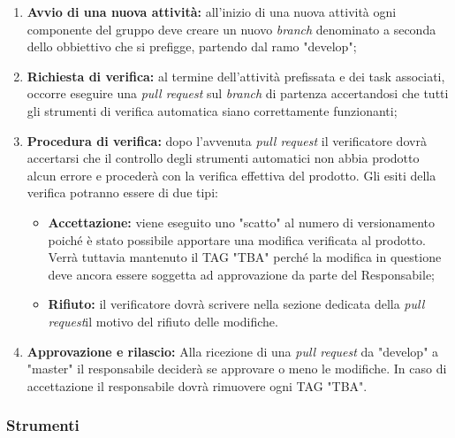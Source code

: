 	\begin{enumerate}
		\item \textbf{Avvio di una nuova attività: } all’inizio di una nuova attività ogni componente del gruppo
		deve creare un nuovo \textit{branch\glos} denominato a seconda dello obbiettivo che si prefigge, partendo dal ramo "develop";
		\item \textbf{Richiesta di verifica: } al termine dell'attività prefissata e dei task associati, occorre eseguire una \textit{pull request\glo} sul \textit{branch\glo} di partenza accertandosi che tutti gli strumenti di verifica automatica siano correttamente funzionanti;
		\item \textbf{Procedura di verifica:} dopo l'avvenuta \textit{pull request\glo} il verificatore dovrà accertarsi che il controllo degli strumenti automatici non abbia prodotto alcun errore e procederà con la verifica effettiva del prodotto. Gli esiti della verifica potranno essere di due tipi:
		\begin{itemize}
			\item \textbf{Accettazione:} viene eseguito uno "scatto" al numero di versionamento poiché è stato possibile apportare una modifica verificata al prodotto. Verrà tuttavia mantenuto il TAG "TBA" perché la modifica in questione deve ancora essere soggetta ad approvazione da parte del Responsabile;
			\item \textbf{Rifiuto:} il verificatore dovrà scrivere nella sezione dedicata della
			\textit{pull request}\glo il motivo del rifiuto delle modifiche.
		\end{itemize}
		\item \textbf{Approvazione e rilascio:} Alla ricezione di una \textit{pull request\glo} da "develop" a "master" il responsabile deciderà se approvare o meno le modifiche. In caso di accettazione il responsabile dovrà rimuovere ogni TAG "TBA".
	\end{enumerate}


\subsubsection{Strumenti}
